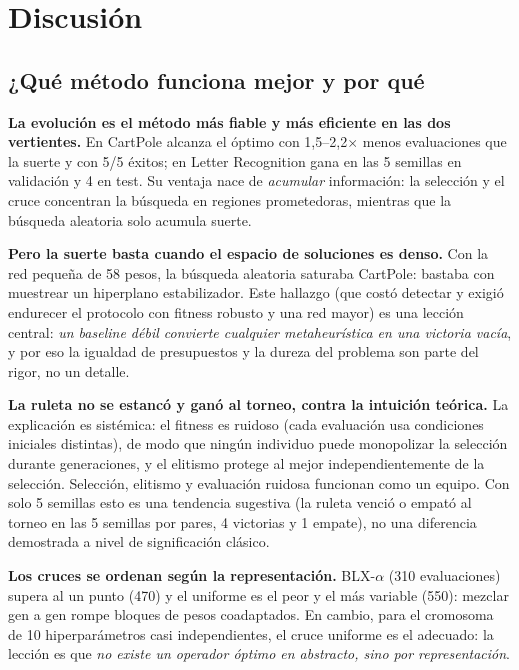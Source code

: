 \section{Discusión}
\label{sec:discusion}

\subsection{¿Qué método funciona mejor y por qué}

\textbf{La evolución es el método más fiable y más eficiente en las dos vertientes.} En CartPole alcanza el óptimo con 1,5--2,2$\times$ menos evaluaciones que la suerte y con 5/5 éxitos; en Letter Recognition gana en las 5 semillas en validación y 4 en test. Su ventaja nace de \emph{acumular} información: la selección y el cruce concentran la búsqueda en regiones prometedoras, mientras que la búsqueda aleatoria solo acumula suerte.

\textbf{Pero la suerte basta cuando el espacio de soluciones es denso.} Con la red pequeña de 58 pesos, la búsqueda aleatoria saturaba CartPole: bastaba con muestrear un hiperplano estabilizador. Este hallazgo (que costó detectar y exigió endurecer el protocolo con fitness robusto y una red mayor) es una lección central: \emph{un baseline débil convierte cualquier metaheurística en una victoria vacía}, y por eso la igualdad de presupuestos y la dureza del problema son parte del rigor, no un detalle.

\textbf{La ruleta no se estancó y ganó al torneo, contra la intuición teórica.} La explicación es sistémica: el fitness es ruidoso (cada evaluación usa condiciones iniciales distintas), de modo que ningún individuo puede monopolizar la selección durante generaciones, y el elitismo protege al mejor independientemente de la selección. Selección, elitismo y evaluación ruidosa funcionan como un equipo. Con solo 5 semillas esto es una tendencia sugestiva (la ruleta venció o empató al torneo en las 5 semillas por pares, 4 victorias y 1 empate), no una diferencia demostrada a nivel de significación clásico.

\textbf{Los cruces se ordenan según la representación.} BLX-$\alpha$ (310 evaluaciones) supera al un punto (470) y el uniforme es el peor y el más variable (550): mezclar gen a gen rompe bloques de pesos coadaptados. En cambio, para el cromosoma de 10 hiperparámetros casi independientes, el cruce uniforme es el adecuado: la lección es que \emph{no existe un operador óptimo en abstracto, sino por representación}.

